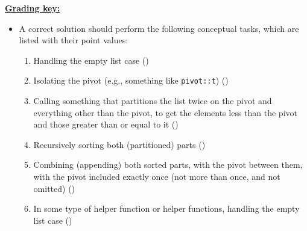 \documentclass[11pt,fleqn]{article}
\begin{document}
\begin{enumerate}
\begin{center}
          \end{center}

          \medskip

          \pagebreak

          \begin{info}{\textbf{\underline{Grading key:}}}

            \begin{itemize}

              \addtolength{\itemsep}{2mm}

              \item A correct solution should perform the following
                    conceptual tasks, which are listed with their point
                    values:

                    \smallskip

                    \begin{enumerate}

                      \addtolength{\itemsep}{0mm}

                      \renewcommand{\labelitemii}{$\ast$}

                      \item Handling the empty list case ()

                      \item Isolating the pivot (e.g., something like
                            \texttt{pivot::t}) ()

                      \item Calling something that partitions the list twice
                            on the pivot and everything other than the
                            pivot, to get the elements less than the pivot
                            and those greater than or equal to it
                            ()

                      \item Recursively sorting both (partitioned) parts
                            ()

                      \item Combining (appending) both sorted parts, with
                            the pivot between them, with the pivot included
                            exactly once (not more than once, and not
                            omitted) ()

                      \item In some type of helper function or helper
                            functions, handling the empty list case
                            ()


\end{enumerate}
\end{itemize}
\end{info}
\end{enumerate}
\end{document}
